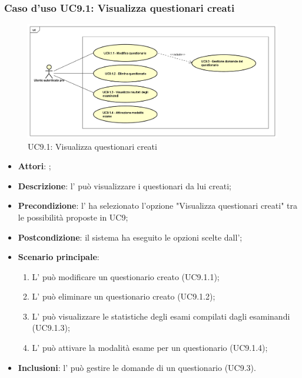 		\subsubsection{Caso d'uso UC9.1: Visualizza questionari creati}
		\label{UC9.1}
		\begin{figure}[h]
			\centering
		\includegraphics[scale=0.5,keepaspectratio]{UML/UC9_1.png}
			\caption{UC9.1: Visualizza questionari creati}
		\end{figure}
		\FloatBarrier
		\begin{itemize}
			\item \textbf{Attori}: \uaupro{};
			\item \textbf{Descrizione}: l'\uaupro{} può visualizzare i questionari da lui creati;
			\item \textbf{Precondizione}: l'\uaupro{} ha selezionato l'opzione "Visualizza questionari creati" tra le possibilità proposte in UC9;
			\item \textbf{Postcondizione}: il sistema ha eseguito le opzioni scelte dall'\uaupro{};
			\item \textbf{Scenario principale}: 
				\begin{enumerate}
					\item L'\uaupro{} può modificare un questionario creato (UC9.1.1);
					\item L'\uaupro{} può eliminare un questionario creato (UC9.1.2);
					\item L'\uaupro{} può visualizzare le statistiche degli esami compilati dagli esaminandi (UC9.1.3);
					\item L'\uaupro{} può attivare la modalità esame per un questionario (UC9.1.4);
				\end{enumerate}
				\item \textbf{Inclusioni}: l'\uaupro{} può gestire le domande di un questionario (UC9.3).
		\end{itemize}
		
